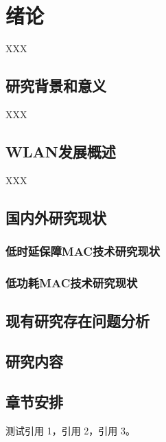
\chapter{绪论}
XXX
\section{研究背景和意义}
XXX
\section{WLAN发展概述}
XXX
\section{国内外研究现状}
\subsection{低时延保障MAC技术研究现状}
\subsection{低功耗MAC技术研究现状}
\section{现有研究存在问题分析}
\section{研究内容}
\section{章节安排}
测试引用 1\cite{周融2003}，引用 2\cite{图书馆,李大伦1998,伍蠡甫,张筑生}，引用 3\cite{冯西桥1998,姜锡洲,gbt7714_2006,科学技术期刊管理办法,中国大学学报论文文摘,DUBAR2013--,FOURNEY}。



